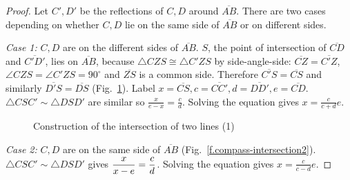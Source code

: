\begin{proof}
Let $C',D'$ be the reflections of $C,D$ around $\overline{AB}$.
There are two cases depending on whether $C,D$ lie on the same side of $\overline{AB}$ or on different sides.

\textit{Case 1:}
$C,D$ are on the different sides of $\overline{AB}$.
$S$, the point of intersection of $\overline{CD}$ and $\overline{C'D'}$, lies on $\overline{AB}$, because $\triangle CZS\cong \triangle C'ZS$ by side-angle-side: $\overline{CZ}=\overline{C'Z}$, $\angle CZS=\angle C'ZS=90^\circ$ and $\overline{ZS}$ is a common side. Therefore $\overline{C'S}=\overline{CS}$ and similarly $\overline{D'S}=\overline{DS}$ (Fig.~\ref{f.compass-intersection1}). Label $x=\overline{CS}, c=\overline{CC'}, d=\overline{DD'},e=\overline{CD}$. $\triangle CSC'\sim\triangle DSD'$ are similar so $\displaystyle\frac{x}{e-x} = \displaystyle\frac{c}{d}$. Solving the equation gives $x=\displaystyle\frac{c}{c+d}e$.

\begin{figure}[ht]
\begin{center}
\end{center}
\caption{Construction of  the intersection of two lines (1)}\label{f.compass-intersection1}
\end{figure}

\textit{Case 2:}
$C,D$ are on the same side of $\overline{AB}$ (Fig.~\ref{f.compass-intersection2}). $\triangle CSC'\sim\triangle DSD'$ gives $\displaystyle\frac{x}{x-e}=\frac{c}{d}\displaystyle$. Solving the equation gives $x=\displaystyle\frac{c}{c-d}e$.


\end{proof}

